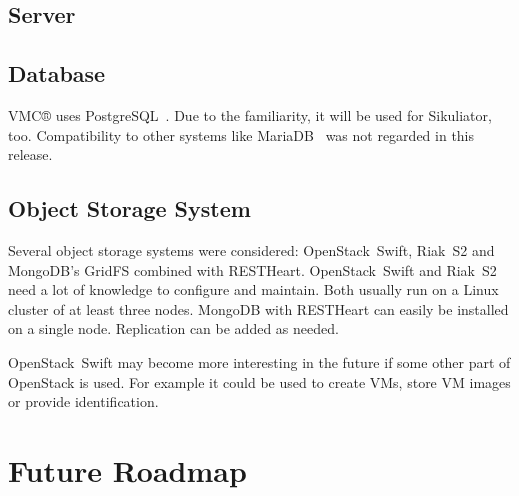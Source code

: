 \documentclass[a4paper,twocolumn]{article}
\newcommand{\VMC}[0]{VMC®}
\begin{document}
\subsection{Server}


\subsection{Database}
\VMC{} uses PostgreSQL~\cite{PostgreSQL}.
Due to the familiarity, it will be used for Sikuliator, too.
Compatibility to other systems like MariaDB~\cite{MariaDB} was not regarded in this release.

\subsection{Object Storage System}
Several object storage systems were considered: OpenStack~Swift\cite{OpenStackSwift}, Riak~S2\cite{RiakS2} and 
MongoDB's\cite{MongoDB} GridFS\cite{GridFS} combined with RESTHeart\cite{RESTHeart}.
OpenStack~Swift and Riak~S2 need a lot of knowledge to configure and maintain.
Both usually run on a Linux cluster of at least three nodes.
MongoDB with RESTHeart can easily be installed on a single node.
Replication can be added as needed.

OpenStack~Swift may become more interesting in the future if some other part of OpenStack is used.
For example it could be used to create VMs, store VM images or provide identification.

\section{Future Roadmap}



\printbibliography[notkeyword=software,resetnumbers=true,prefixnumbers=R]
\printbibliography[keyword=used,title={Used software},resetnumbers=true,prefixnumbers=US]
\printbibliography[notkeyword=used,keyword=software,title={Other software},resetnumbers=true,prefixnumbers=OS]
\end{document}
